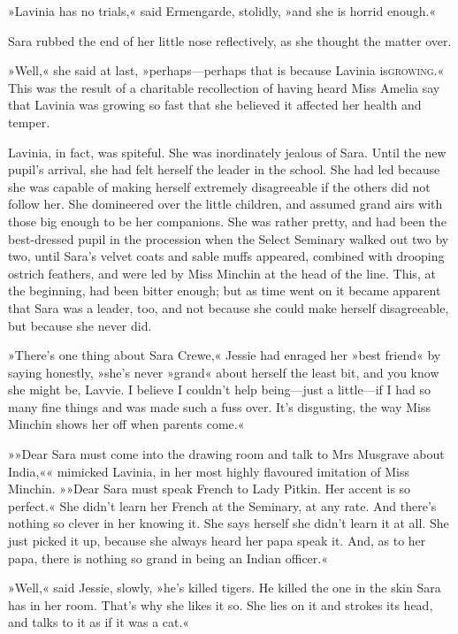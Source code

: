 »Lavinia has no trials,« said Ermengarde, stolidly, »and she is horrid enough.«

Sara rubbed the end of her little nose reflectively, as she thought the matter over.

»Well,« she said at last, »perhaps—perhaps that is because Lavinia is\textsc{growing}.« This was the result of a charitable recollection of having heard Miss Amelia say that Lavinia was growing so fast that she believed it affected her health and temper.

Lavinia, in fact, was spiteful. She was inordinately jealous of Sara. Until the new pupil's arrival, she had felt herself the leader in the school. She had led because she was capable of making herself extremely disagreeable if the others did not follow her. She domineered over the little children, and assumed grand airs with those big enough to be her companions. She was rather pretty, and had been the best-dressed pupil in the procession when the Select Seminary walked out two by two, until Sara's velvet coats and sable muffs appeared, combined with drooping ostrich feathers, and were led by Miss Minchin at the head of the line. This, at the beginning, had been bitter enough; but as time went on it became apparent that Sara was a leader, too, and not because she could make herself disagreeable, but because she never did.

»There's one thing about Sara Crewe,« Jessie had enraged her »best friend« by saying honestly, »she's never »grand« about herself the least bit, and you know she might be, Lavvie. I believe I couldn't help being—just a little—if I had so many fine things and was made such a fuss over. It's disgusting, the way Miss Minchin shows her off when parents come.«

»»Dear Sara must come into the drawing room and talk to Mrs Musgrave about India,«« mimicked Lavinia, in her most highly flavoured imitation of Miss Minchin. »»Dear Sara must speak French to Lady Pitkin. Her accent is so perfect.« She didn't learn her French at the Seminary, at any rate. And there's nothing so clever in her knowing it. She says herself she didn't learn it at all. She just picked it up, because she always heard her papa speak it. And, as to her papa, there is nothing so grand in being an Indian officer.«

»Well,« said Jessie, slowly, »he's killed tigers. He killed the one in the skin Sara has in her room. That's why she likes it so. She lies on it and strokes its head, and talks to it as if it was a cat.«

